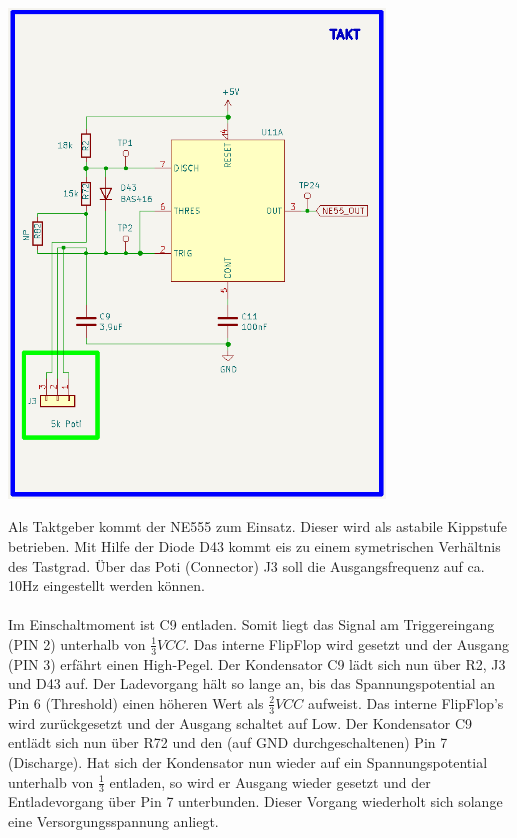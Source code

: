 \begin{center}
\includegraphics[width=10cm]{Bilder/Takt.png}
\end{center}

Als Taktgeber kommt der \glqq NE555 \grqq{} zum Einsatz. Dieser wird als astabile Kippstufe betrieben. Mit Hilfe der Diode D43 kommt eis zu einem symetrischen Verhältnis des Tastgrad. Über das Poti (Connector) J3 soll die Ausgangsfrequenz auf ca. 10Hz eingestellt werden können. 
\\
\\
Im Einschaltmoment ist C9 entladen. Somit liegt das Signal am Triggereingang (PIN 2) unterhalb von $\frac{1}{3} VCC$. Das interne FlipFlop wird gesetzt und der Ausgang (PIN 3) erfährt einen High-Pegel. Der Kondensator C9 lädt sich nun über R2, J3 und D43 auf. Der Ladevorgang hält so lange an, bis das Spannungspotential an Pin 6 (Threshold) einen höheren Wert als $\frac{2}{3} VCC$ aufweist. Das interne FlipFlop's wird zurückgesetzt und der Ausgang schaltet auf Low. Der Kondensator C9 entlädt sich nun über R72 und den (auf GND durchgeschaltenen) Pin 7 (Discharge). Hat sich der Kondensator nun wieder auf ein Spannungspotential unterhalb von $\frac{1}{3}$ entladen, so wird er Ausgang wieder gesetzt und der Entladevorgang über Pin 7 unterbunden. Dieser Vorgang wiederholt sich solange eine Versorgungsspannung anliegt. 

